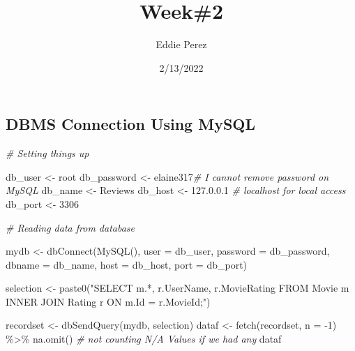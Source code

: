 \documentclass[
]{article}
\title{Week\#2}
\author{Eddie Perez}
\date{2/13/2022}
\newenvironment{Shaded}{\begin{snugshade}}{\end{snugshade}}
\newcommand{\AttributeTok}[1]{\textcolor[rgb]{0.77,0.63,0.00}{#1}}
\newcommand{\CommentTok}[1]{\textcolor[rgb]{0.56,0.35,0.01}{\textit{#1}}}
\newcommand{\DecValTok}[1]{\textcolor[rgb]{0.00,0.00,0.81}{#1}}
\newcommand{\FunctionTok}[1]{\textcolor[rgb]{0.00,0.00,0.00}{#1}}
\newcommand{\NormalTok}[1]{#1}
\newcommand{\OtherTok}[1]{\textcolor[rgb]{0.56,0.35,0.01}{#1}}
\newcommand{\SpecialCharTok}[1]{\textcolor[rgb]{0.00,0.00,0.00}{#1}}
\newcommand{\StringTok}[1]{\textcolor[rgb]{0.31,0.60,0.02}{#1}}
\begin{document}
\maketitle

\hypertarget{dbms-connection-using-mysql}{%
\subsection{DBMS Connection Using
MySQL}\label{dbms-connection-using-mysql}}

\begin{Shaded}
\begin{Highlighting}[]
\CommentTok{\# Setting things up}

\NormalTok{db\_user }\OtherTok{\textless{}{-}} \StringTok{\textquotesingle{}root\textquotesingle{}}
\NormalTok{db\_password }\OtherTok{\textless{}{-}} \StringTok{\textquotesingle{}elaine317\textquotesingle{}}\CommentTok{\# I cannot remove password on MySQL}
\NormalTok{db\_name }\OtherTok{\textless{}{-}} \StringTok{\textquotesingle{}Reviews\textquotesingle{}}
\NormalTok{db\_host }\OtherTok{\textless{}{-}} \StringTok{\textquotesingle{}127.0.0.1\textquotesingle{}} \CommentTok{\# localhost for local access}
\NormalTok{db\_port }\OtherTok{\textless{}{-}} \DecValTok{3306}

\CommentTok{\# Reading data from database}

\NormalTok{mydb }\OtherTok{\textless{}{-}}  \FunctionTok{dbConnect}\NormalTok{(}\FunctionTok{MySQL}\NormalTok{(), }\AttributeTok{user =}\NormalTok{ db\_user, }\AttributeTok{password =}\NormalTok{ db\_password,}
                   \AttributeTok{dbname =}\NormalTok{ db\_name, }\AttributeTok{host =}\NormalTok{ db\_host, }\AttributeTok{port =}\NormalTok{ db\_port)}

\NormalTok{selection }\OtherTok{\textless{}{-}} \FunctionTok{paste0}\NormalTok{(}\StringTok{"SELECT m.*, r.UserName, r.MovieRating }
\StringTok{                         FROM Movie m }
\StringTok{                              INNER JOIN Rating r }
\StringTok{                                  ON m.Id = r.MovieId;"}\NormalTok{)}

\NormalTok{recordset }\OtherTok{\textless{}{-}} \FunctionTok{dbSendQuery}\NormalTok{(mydb, selection)}
\NormalTok{dataf }\OtherTok{\textless{}{-}}  \FunctionTok{fetch}\NormalTok{(recordset, }\AttributeTok{n =} \SpecialCharTok{{-}}\DecValTok{1}\NormalTok{) }\SpecialCharTok{\%\textgreater{}\%} \FunctionTok{na.omit}\NormalTok{() }\CommentTok{\# not counting N/A Values if we had any}
\NormalTok{dataf}
\end{Highlighting}
\end{Shaded}
\end{document}
